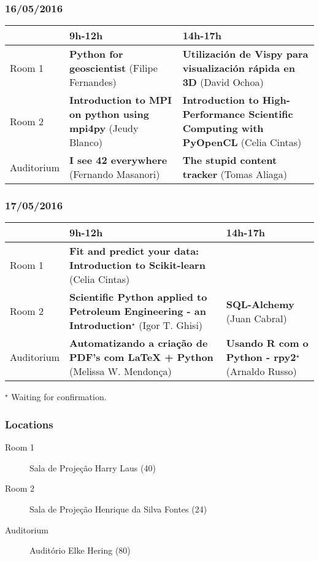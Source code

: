 \documentclass[12pt]{article}
\begin{document}
\subsubsection*{16/05/2016}

\begin{center}
   {\footnotesize{%
       \begin{tabular}{@{}l p{5cm} p{5cm}@{}}
     \toprule
      & 9h-12h & 14h-17h\\\midrule
     Room 1 & \textbf{Python for geoscientist} (Filipe Fernandes) & \textbf{Utilización de Vispy para visualización rápida en 3D} (David Ochoa)\\
     Room 2 & \textbf{Introduction to MPI on python using mpi4py} (Jeudy Blanco) & \textbf{Introduction to High-Performance Scientific Computing with PyOpenCL} (Celia Cintas)\\
     Auditorium & \textbf{I see 42 everywhere} (Fernando Masanori) & \textbf{The stupid content tracker} (Tomas Aliaga)\\\bottomrule
   \end{tabular}
 }}
\end{center}

\subsubsection*{17/05/2016}

\begin{center}
   {\footnotesize{%
     \begin{tabular}{@{}l p{5cm} p{5cm}@{}}
     \toprule
      & 9h-12h & 14h-17h\\\midrule
     Room 1 & \textbf{Fit and predict your data: Introduction to Scikit-learn} (Celia Cintas) & \\
     Room 2 & \textbf{Scientific Python applied to Petroleum Engineering - an Introduction$^\star$} (Igor T. Ghisi) & \textbf{SQL-Alchemy} (Juan Cabral) \\
     Auditorium & \textbf{Automatizando a criação de PDF's com LaTeX + Python} (Melissa W. Mendonça) & \textbf{Usando R com o Python - rpy2$^\star$} (Arnaldo Russo)\\\bottomrule
   \end{tabular}
 }}
\end{center}
{\hspace*{9.3cm}\scriptsize{$^\star$ Waiting for confirmation.}}

\vspace*{-0.5cm}
\subsubsection*{Locations}
{\footnotesize{%
\begin{description}
   \item[Room 1] Sala de Projeção Harry Laus (40)
   \item[Room 2] Sala de Projeção Henrique da Silva Fontes (24)
   \item[Auditorium] Auditório Elke Hering (80)
\end{description}
}}
\end{document}
